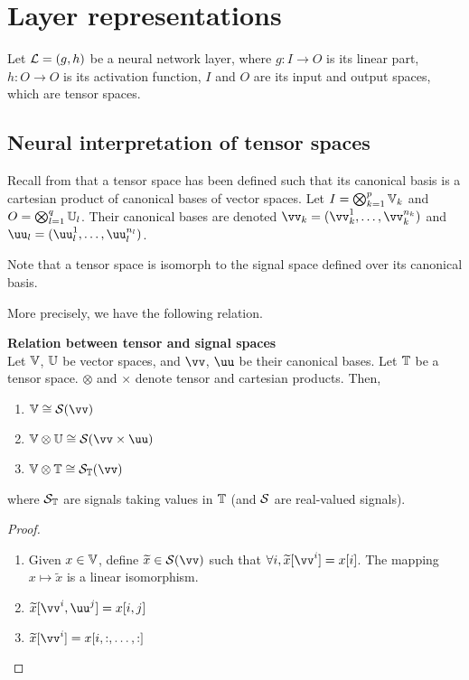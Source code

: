 \section{Layer representations}
\label{sec:rep}

Let $\mathcal{L} = (g,h)$ be a neural network layer, where $g: I \rightarrow O$ is its linear part, $h : O \rightarrow O$ is its activation function, $I$ and $O$ are its input and output spaces, which are tensor spaces. 

\subsection{Neural interpretation of tensor spaces}

Recall from  that a tensor space has been defined such that its canonical basis is a cartesian product of canonical bases of vector spaces. Let $I = \bigotimes_{k=1}^p \mathbb{V}_k$ and $O =  \bigotimes_{l=1}^q \mathbb{U}_l$.
Their canonical bases are denoted $\vv_k = (\vv_k^1, \ldots, \vv_k^{n_k})$ and $\uu_l = (\uu_l^1, \ldots, \uu_l^{n_l})$.

\begin{remark}
Note that a tensor space is isomorph to the signal space defined over its canonical basis.
\end{remark}

More precisely, we have the following relation.

\begin{lemma}\textbf{Relation between tensor and signal spaces}\\
Let $\mathbb{V}$, $\mathbb{U}$ be vector spaces, and $\vv$, $\uu$ be their canonical bases. Let $\mathbb{T}$ be a tensor space. $\otimes$ and $\times$ denote tensor and cartesian products. Then,
\begin{enumerate}[label=(\roman*)]
  \item $\bbv \cong \cs(\vv)$
  \item $\bbv \otimes \bbu \cong \cs(\vv \times \uu)$
  \item $\bbv \otimes \bbt \cong \cs_{\bbt}(\vv)$
\end{enumerate}
where $\mathcal{S}_{\mathbb{T}}$ are signals taking values in $\mathbb{T}$ (and $\mathcal{S}$ are real-valued signals).
\label{lem:relts}
\end{lemma}
\begin{proof}
\begin{enumerate}[label=(\roman*)]
  \item Given $x \in \mathbb{V}$, define $\widetilde{x} \in \cs(\vv)$ such that $\forall i, \widetilde{x}[\vv^i] = x[i]$. The mapping $x \mapsto \widetilde{x}$ is a linear isomorphism. \label{enum:li}
  \item $\widetilde{x}[\vv^i, \uu^j] = x[i,j]$
  \item $\widetilde{x}[\vv^i] = x[i,:,\ldots,:]$
\end{enumerate}
\end{proof}

